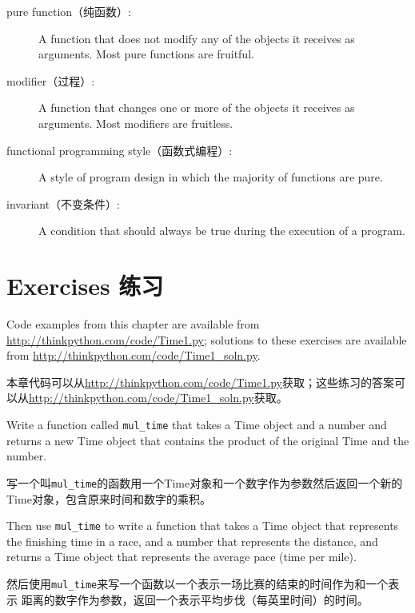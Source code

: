\documentclass[10pt]{book}
\begin{document}
\begin{CJK}{UTF8}{gbsn}
\begin{description}
\item[pure function（纯函数）:] A function that does not modify any of the objects it
receives as arguments.  Most pure functions are fruitful.

\item[modifier（过程）:] A function that changes one or more of the objects it
receives as arguments.  Most modifiers are fruitless.

\item[functional programming style（函数式编程）:] A style of program design in which the
majority of functions are pure.

\item[invariant（不变条件）:] A condition that should always be true during the
execution of a program.

\end{description}


\section{Exercises 练习}

Code examples from this chapter are available from
\url{http://thinkpython.com/code/Time1.py}; solutions to these
exercises are available from \url{http://thinkpython.com/code/Time1_soln.py}.

本章代码可以从\url{http://thinkpython.com/code/Time1.py}获取；这些练习的答案可
以从\url{http://thinkpython.com/code/Time1_soln.py}获取。

\begin{exercise}

Write a function called \verb"mul_time" that takes a Time object
and a number and returns a new Time object that contains
the product of the original Time and the number.

写一个叫\verb"mul_time"的函数用一个Time对象和一个数字作为参数然后返回一个新的
Time对象，包含原来时间和数字的乘积。

Then use \verb"mul_time" to write a function that takes a Time
object that represents the finishing time in a race, and a number
that represents the distance, and returns a Time object that represents
the average pace (time per mile).

然后使用\verb"mul_time"来写一个函数以一个表示一场比赛的结束的时间作为和一个表示
距离的数字作为参数，返回一个表示平均步伐（每英里时间）的时间。


\end{exercise}
\end{CJK}
\end{document}
